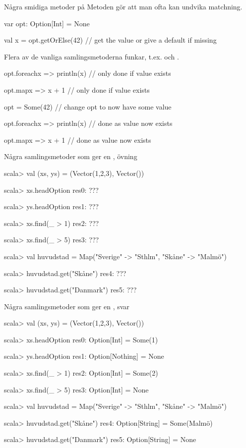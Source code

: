 \begin{Slide}{Några smidiga metoder på }\SlideFontSmall
Metoden  gör att man ofta kan undvika matchning.
\begin{Code}
var opt: Option[Int] = None

val x = opt.getOrElse(42)      // get the value or give a default if missing
\end{Code}

Flera av de vanliga samlingsmetoderna funkar, t.ex.  och .
\begin{Code}
opt.foreach{x => println(x)}    // only done if value exists

opt.map{x => x + 1}             // only done if value exists

opt = Some(42)                  // change opt to now have some value

opt.foreach{x => println(x)}    // done as value now exists

opt.map{x => x + 1}             // done as value now exists

\end{Code}
\end{Slide}


\begin{Slide}{Några samlingsmetoder som ger en , övning}
\begin{REPL}
scala> val (xs, ys) = (Vector(1,2,3), Vector())

scala> xs.headOption
res0: ???

scala> ys.headOption
res1: ???

scala> xs.find(_ > 1)
res2: ???

scala> xs.find(_ > 5)
res3: ???

scala> val huvudstad = Map("Sverige" -> "Sthlm", "Skåne" -> "Malmö")

scala> huvudstad.get("Skåne")
res4: ???

scala> huvudstad.get("Danmark")
res5: ???
\end{REPL}
\end{Slide}

\begin{Slide}{Några samlingsmetoder som ger en , svar}
\begin{REPL}
scala> val (xs, ys) = (Vector(1,2,3), Vector())

scala> xs.headOption
res0: Option[Int] = Some(1)

scala> ys.headOption
res1: Option[Nothing] = None

scala> xs.find(_ > 1)
res2: Option[Int] = Some(2)

scala> xs.find(_ > 5)
res3: Option[Int] = None

scala> val huvudstad = Map("Sverige" -> "Sthlm", "Skåne" -> "Malmö")

scala> huvudstad.get("Skåne")
res4: Option[String] = Some(Malmö)

scala> huvudstad.get("Danmark")
res5: Option[String] = None
\end{REPL}
\end{Slide}
